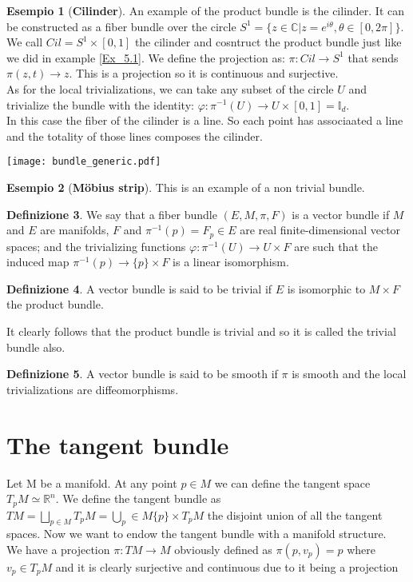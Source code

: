 \documentclass[12pt,a4paper]{report}
\theoremstyle{definition}
\newtheorem{Def}{Definizione}[chapter]
\theoremstyle{Theorem}
\theoremstyle{definition}
\newtheorem{Ex}[Def]{Esempio}
\theoremstyle{definition}
\theoremstyle{definition}
\begin{document}
	\begin{Ex}[\textbf{Cilinder}] \label{Ex_5.2}
		An example of the product bundle is the cilinder. It can be constructed as a fiber bundle over the circle $S^1=\{z\in \mathbb{C}|z=e^{i\theta}, \theta\in[0,2\pi]\}$. We call $Cil=S^1\times [0,1]$ the cilinder and cosntruct the product bundle just like we did in example \ref{Ex_5.1}. We define the projection as: $\pi:Cil\rightarrow S^1$ that sends $\pi(z,t)\rightarrow z$. This is a projection so it is continuous and surjective.\\
		As for the local trivializations, we can take any subset of the circle $U$ and trivialize the bundle with the identity:
		$\varphi:\pi^{-1}(U)\rightarrow U\times [0,1]=\mathbb{I}_d$.\\
		In this case the fiber of the cilinder is a line. So each point has associaated a line and the totality of those lines composes the cilinder.
		\begin{center}
			\texttt{[image: bundle\_generic.pdf]}
	\end{center}
	\end{Ex}
	\begin{Ex}[\textbf{Möbius strip}]\label{Ex_5.3}
		This is an example of a non trivial bundle.
	\end{Ex}
	\begin{Def}\label{Def_5.2}
		We say that a fiber bundle $(E,M,\pi,F)$ is a vector bundle if $M$ and $E$ are manifolds, $F$ and $\pi^{-1}(p)=F_p\in E$ are real finite-dimensional vector spaces; and the trivializing functions $\varphi:\pi^{-1}(U)\rightarrow U\times F$ are such that the induced map $\pi^{-1}(p)\rightarrow\{p\}\times F$ is a linear isomorphism.
	\end{Def}
	\begin{Def}\label{Def_5.3}
		A vector bundle is said to be trivial if $E$ is isomorphic to $M\times F$ the product bundle.
	\end{Def}
	It clearly follows that the product bundle is trivial and so it is called the trivial bundle also.
	\begin{Def}\label{Def_5.4}
		A vector bundle is said to be smooth if $\pi$ is smooth and the local trivializations are diffeomorphisms.
	\end{Def}
	\section{The tangent bundle}
		Let M be a manifold. At any point $p\in M$ we can define the tangent space $T_pM\simeq \mathbb{R}^n$. We define the tangent bundle as $TM=\bigsqcup_{p\in M}T_pM=\bigcup_p\in M \{p\}\times T_pM$ the disjoint union of all the tangent spaces. Now we want to endow the tangent bundle with a manifold structure.\\
		We have a projection $\pi:TM\rightarrow M$ obviously defined as $\pi(p,v_p)=p$ where $v_p\in T_pM$ and it is clearly surjective and continuous due to it being a projection
\end{document}

